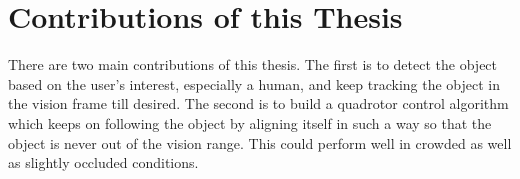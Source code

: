 %
%
%		

	\section{Contributions of this Thesis}
	\label{sec:Contributions of this Thesis}
		There are two main contributions of this thesis. The first is to detect the object based on the user's interest, especially a human, and keep tracking the object in the vision frame till desired. The second is to build a quadrotor control algorithm which keeps on following the object by aligning itself in such a way so that the object is never out of the vision range. This could perform well in crowded as well as slightly occluded conditions.
		

